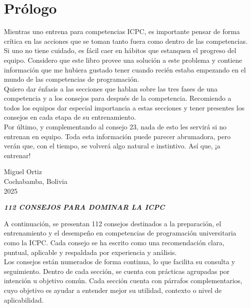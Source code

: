 \clearpage
\section*{Prólogo}
Mientras uno entrena para competencias ICPC, es importante pensar de forma crítica en las acciones que se toman tanto fuera como dentro de las competencias. Si uno no tiene cuidado, es fácil caer en hábitos que estanquen el progreso del equipo. Considero que este libro provee una solución a este problema y contiene información que me hubiera gustado tener cuando recién estaba empezando en el mundo de las competencias de programación.\\

Quiero dar énfasis a las secciones que hablan sobre las tres fases de una competencia y a los consejos para después de la competencia. Recomiendo a todos los equipos dar especial importancia a estas secciones y tener presentes los consejos en cada etapa de su entrenamiento.\\

Por último, y complementando al consejo 23, nada de esto les servirá si no entrenan en equipo. Toda esta información puede parecer abrumadora, pero verán que, con el tiempo, se volverá algo natural e instintivo. Así que, ¡a entrenar!
\vspace{0.5cm} %

\begin{flushright}
Miguel Ortiz\\
Cochabamba, Bolivia\\
2025
\end{flushright}
\pagebreak
\begin{center}
\large{\textbf{\textit{112 CONSEJOS PARA DOMINAR LA ICPC}}}
\end{center}
A continuación, se presentan 112 consejos destinados a la preparación, el entrenamiento y el desempeño en competencias de programación universitaria como la ICPC. Cada consejo se ha escrito como una recomendación clara, puntual, aplicable y respaldada por experiencia y análisis.\\

Los consejos están numerados de forma continua, lo que facilita su consulta y seguimiento. Dentro de cada sección, se cuenta con prácticas agrupadas por intención u objetivo común. Cada sección cuenta con párrafos complementarios, cuyo objetivo es ayudar a entender mejor su utilidad, contexto o nivel de aplicabilidad.\\

